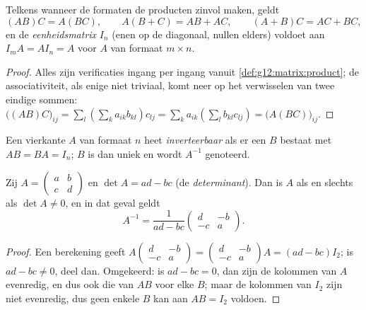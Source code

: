 \begin{proposition}\label{prop:g12:matrix:rules}
Telkens wanneer de formaten de producten zinvol maken, geldt
\[
(AB)C = A(BC), \qquad A(B + C) = AB + AC, \qquad (A+B)C = AC + BC,
\]
en de \emph{eenheidsmatrix} $I_n$ (enen op de diagonaal, nullen elders)
voldoet aan $I_m A = A I_n = A$ voor $A$ van formaat $m \times n$.
\end{proposition}

\begin{proof}
Alles zijn verificaties ingang per ingang vanuit
\cref{def:g12:matrix:product}; de associativiteit, als enige niet triviaal,
komt neer op het verwisselen van twee eindige sommen:
$\bigl((AB)C\bigr)_{ij} = \sum_l \left(\sum_k a_{ik}b_{kl}\right) c_{lj}
= \sum_k a_{ik} \left(\sum_l b_{kl} c_{lj}\right)
= \bigl(A(BC)\bigr)_{ij}$.
\end{proof}

\begin{definition}[Inverse]\label{def:g12:matrix:inverse}
Een vierkante  $A$ van formaat $n$ heet
\emph{inverteerbaar} als er een  $B$ bestaat met
$AB = BA = I_n$; $B$ is dan uniek en wordt $A^{-1}$ genoteerd.
\end{definition}

\begin{proposition}\label{prop:g12:matrix:inverse2x2}
Zij $A = \begin{pmatrix} a & b\\ c & d\end{pmatrix}$ en
$\det A = ad - bc$ (de \emph{determinant}). Dan is $A$
 als en slechts als $\det A \neq 0$, en in dat geval geldt
\[
A^{-1} = \frac{1}{ad - bc}\begin{pmatrix} d & -b\\ -c & a\end{pmatrix}.
\]
\end{proposition}

\begin{proof}
Een berekening geeft
$A \begin{pmatrix} d & -b\\ -c & a\end{pmatrix}
= \begin{pmatrix} d & -b\\ -c & a\end{pmatrix} A = (ad - bc) I_2$; is
$ad - bc \neq 0$, deel dan. Omgekeerd: is $ad - bc = 0$, dan zijn de kolommen
van $A$ evenredig, en dus ook die van $AB$ voor elke $B$; maar de kolommen van
$I_2$ zijn niet evenredig, dus geen enkele $B$ kan aan $AB = I_2$ voldoen.
\end{proof}

